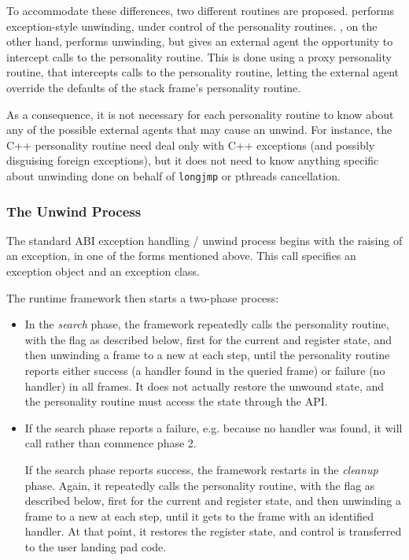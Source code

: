 To accommodate these differences, two different routines are proposed.
 performs exception-style unwinding,
under control of the personality routines. ,
on the other hand, performs unwinding, but gives an external agent the
opportunity to intercept calls to the personality routine. This is done using
a proxy personality routine, that intercepts calls to the personality routine,
letting the external agent override the defaults of the stack frame's 
personality routine.

As a consequence, it is not necessary for each personality routine to know 
about any of the possible external agents that may cause an unwind. For 
instance, the C++ personality routine need deal only with C++ exceptions
(and possibly disguising foreign exceptions), but it does not need to know
anything specific about unwinding done on behalf of \texttt{longjmp} or
pthreads cancellation.

\subsubsection{The Unwind Process}

The standard ABI exception handling / unwind process begins with the raising
of an exception, in one of the forms mentioned above. This call specifies an
exception object and an exception class.

The runtime framework then starts a two-phase process:
\begin{itemize}
\item In the \emph{search} phase, the framework repeatedly calls the
personality routine, with the  flag as
described below, first for the current \RIP and register state, and then
unwinding a frame to a new \RIP at each step, until the personality
routine reports either success (a handler found in the queried frame)
or failure (no handler) in all frames. It does not actually restore the
unwound state, and the personality routine must access the state through
the API.

\item If the search phase reports a failure, e.g. because no handler was
found, it will call  rather than commence phase 2.

If the search phase reports success, the framework restarts in the 
\emph{cleanup} phase. Again, it repeatedly calls the personality
routine, with the  flag as described
below, first for the current \RIP and register state, and then unwinding
a frame to a new \RIP at each step, until it gets to the frame with 
an identified handler. At that point, it restores the register state,
and control is transferred to the user landing pad code.
\end {itemize}

